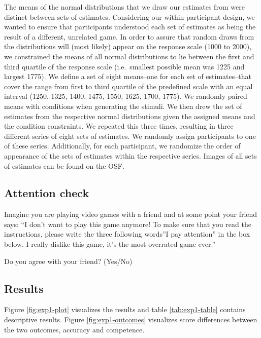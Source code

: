 \documentclass[
  doc,floatsintext]{apa6}
\begin{document}
\FloatBarrier

The means of the normal distributions that we draw our estimates from were distinct between sets of estimates. Considering our within-participant design, we wanted to ensure that participants understood each set of estimates as being the result of a different, unrelated game. In order to assure that random draws from the distributions will (most likely) appear on the response scale (1000 to 2000), we constrained the means of all normal distributions to lie between the first and third quartile of the response scale (i.e.~smallest possible mean was 1225 and largest 1775). We define a set of eight means--one for each set of estimates--that cover the range from first to third quartile of the predefined scale with an equal interval (1250, 1325, 1400, 1475, 1550, 1625, 1700, 1775). We randomly paired means with conditions when generating the stimuli. We then drew the set of estimates from the respective normal distributions given the assigned means and the condition constraints. We repeated this three times, resulting in three different series of eight sets of estimates. We randomly assign participants to one of these series. Additionally, for each participant, we randomize the order of appearance of the sets of estimates within the respective series. Images of all sets of estimates can be found on the OSF.

\subsection{Attention check}\label{attention-check}

Imagine you are playing video games with a friend and at some point your friend says: ``I don't want to play this game anymore! To make sure that you read the instructions, please write the three following words''I pay attention'' in the box below. I really dislike this game, it's the most overrated game ever.''

Do you agree with your friend? (Yes/No)

\subsection{Results}\label{results}

Figure \ref{fig:exp1-plot} visualizes the results and table \ref{tab:exp1-table} contains descriptive results. Figure \ref{fig:exp1-outcomes} visualizes score differences between the two outcomes, accuracy and competence.
\end{document}
